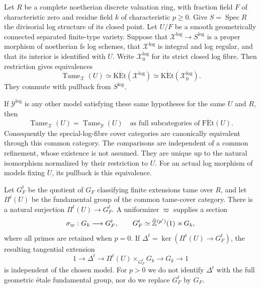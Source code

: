 \begin{theorem}\label{A6-tame-specialization}
Let $R$ be a complete noetherian discrete valuation ring, with fraction
field $F$ of characteristic zero and residue field $k$ of characteristic
$p\geq0$. Give $S=\operatorname{Spec}R$ the divisorial log structure of
its closed point. Let $U/F$ be a smooth geometrically connected
separated finite-type variety.
Suppose that $\mathcal X^{\log}\to S^{\log}$ is a proper morphism of
noetherian fs log schemes, that $\mathcal X^{\log}$ is integral and log
regular, and that its interior is identified with $U$. Write
$\mathcal X_0^{\log}$ for its strict closed log fibre. Then restriction
gives equivalences
\[
 \operatorname{Tame}_{\mathcal X}(U)
 \simeq\operatorname{K\acute Et}(\mathcal X^{\log})
 \simeq\operatorname{K\acute Et}(\mathcal X_0^{\log}).
\]
They commute with pullback from $S^{\log}$.

If $\mathcal Y^{\log}$ is any other model satisfying these same
hypotheses for the same $U$ and $R$, then
\[
 \operatorname{Tame}_{\mathcal X}(U)
       =\operatorname{Tame}_{\mathcal Y}(U)
       \quad\text{as full subcategories of }\operatorname{F\acute Et}(U).
\]
Consequently the special-log-fibre cover categories are canonically
equivalent through this common category. The comparisons are independent
of a common refinement, whose existence is not assumed. They are unique
up to the natural isomorphism normalized by their restriction to $U$.
For an actual log morphism of models fixing $U$, its pullback is this
equivalence.

Let $G_F^t$ be the quotient of $G_F$ classifying finite extensions tame
over $R$, and let $\Pi^t(U)$ be the fundamental group of the common
tame-cover category. There is a natural surjection
$\Pi^t(U)\to G_F^t$. A uniformizer $\varpi$ supplies a section
\[
 \sigma_{\varpi}:G_k\longrightarrow G_F^t,
 \qquad
 G_F^t\simeq\widehat{{\mathbb{Z}}}^{(p')}(1)\rtimes G_k,
\]
where all primes are retained when $p=0$. If
$\Delta^t=\ker(\Pi^t(U)\to G_F^t)$, the resulting tangential extension
\[
 1\longrightarrow\Delta^t\longrightarrow
 \Pi^t(U)\times_{G_F^t}G_k
 \longrightarrow G_k\longrightarrow1
\]
is independent of the chosen model. For $p>0$ we do not identify
$\Delta^t$ with the full geometric \'etale fundamental group, nor do
we replace $G_F^t$ by $G_F$.
\end{theorem}

